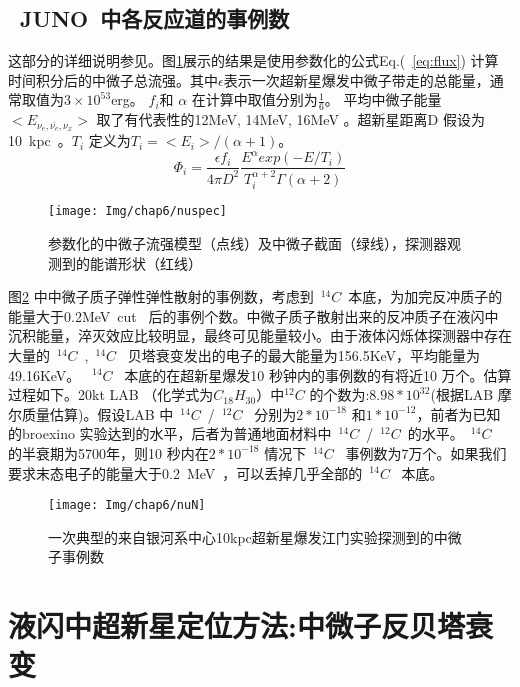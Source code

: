 \subsection{~JUNO~中各反应道的事例数}
这部分的详细说明参见\citep{an2015neutrino}。图\ref{fig:nuspec}展示的结果是使用参数化的公式Eq.(~\ref{eq:flux}) 计算时间积分后的中微子总流强。其中$\epsilon$表示一次超新星爆发中微子带走的总能量，通常取值为$3\times10^{53}$erg。 $f_i$和 $\alpha$ 在计算中取值分别为$\frac{1}{6}$。 平均中微子能量$<E_{\nu_e,\bar{\nu_e},\nu_x}>$ 取了有代表性的12MeV, 14MeV, 16MeV 。超新星距离D 假设为10~kpc~。$T_i$ 定义为$T_i = <E_i> /(\alpha+1)$。
\begin{equation}\label{eq:flux}
\Phi_i=\frac{\epsilon f_i}{4\pi D^2}\frac{E^{\alpha} exp(-E/T_i)}{T^{\alpha+2}_{i}\Gamma(\alpha+2)}
\end{equation}
\begin{figure}[!htb]
  \centering
   \texttt{[image: Img/chap6/nuspec]}
    \caption{参数化的中微子流强模型（点线）及中微子截面（绿线），探测器观测到的能谱形状（红线）}
  \label{fig:nuspec}
\end{figure}
图\ref{fig:pnuN} 中中微子质子弹性弹性散射的事例数，考虑到~$^{14}C$~本底，为加完反冲质子的能量大于0.2MeV~cut~ 后的事例个数。中微子质子散射出来的反冲质子在液闪中沉积能量，淬灭效应比较明显，最终可见能量较小。由于液体闪烁体探测器中存在大量的~$^{14}C$~,~$^{14}C$~ 贝塔衰变发出的电子的最大能量为156.5KeV，平均能量为49.16KeV。 ~$^{14}C$~ 本底的在超新星爆发10 秒钟内的事例数的有将近10 万个。估算过程如下。20kt LAB （化学式为$C_{18}H_{30}$）中$^{12}C$ 的个数为:$8.98*10^{32}$(根据LAB 摩尔质量估算)。假设LAB 中~$^{14}C$~/~$^{12}C$~ 分别为$2*10^{-18}$ 和$1*10^{-12}$，前者为已知的broexino 实验达到的水平，后者为普通地面材料中~$^{14}C$~/~$^{12}C$~的水平。~$^{14}C$~ 的半衰期为5700年，则10 秒内在$2*10^{-18}$ 情况下~$^{14}C$~ 事例数为7万个。如果我们要求末态电子的能量大于0.2~MeV~，可以丢掉几乎全部的~$^{14}C$~ 本底。
\begin{figure}[!htbp]
  \centering
   \texttt{[image: Img/chap6/nuN]}
    \caption{一次典型的来自银河系中心10kpc超新星爆发江门实验探测到的中微子事例数}
  \label{fig:pnuN}
\end{figure}

\section{液闪中超新星定位方法:中微子反贝塔衰变}
